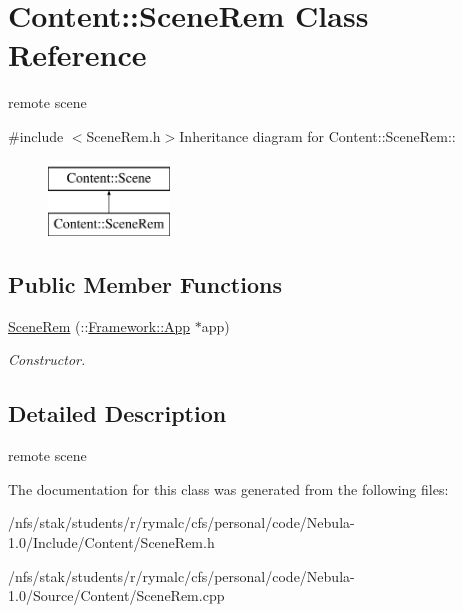 \hypertarget{classContent_1_1SceneRem}{
\section{Content::SceneRem Class Reference}
\label{classContent_1_1SceneRem}
}


remote scene  


{\ttfamily \#include $<$SceneRem.h$>$}Inheritance diagram for Content::SceneRem::\begin{figure}[H]
\begin{center}
\leavevmode
\includegraphics[height=2cm]{classContent_1_1SceneRem}
\end{center}
\end{figure}
\subsection*{Public Member Functions}
\begin{DoxyCompactItemize}
\item 
\hypertarget{classContent_1_1SceneRem_ae2ef7156dddad87885b75d699ee7dd1a}{
\hyperlink{classContent_1_1SceneRem_ae2ef7156dddad87885b75d699ee7dd1a}{SceneRem} (::\hyperlink{classFramework_1_1App}{Framework::App} $\ast$app)}
\label{classContent_1_1SceneRem_ae2ef7156dddad87885b75d699ee7dd1a}

\begin{DoxyCompactList}\small\item\em Constructor. \item\end{DoxyCompactList}\end{DoxyCompactItemize}


\subsection{Detailed Description}
remote scene 

The documentation for this class was generated from the following files:\begin{DoxyCompactItemize}
\item 
/nfs/stak/students/r/rymalc/cfs/personal/code/Nebula-\/1.0/Include/Content/SceneRem.h\item 
/nfs/stak/students/r/rymalc/cfs/personal/code/Nebula-\/1.0/Source/Content/SceneRem.cpp\end{DoxyCompactItemize}
